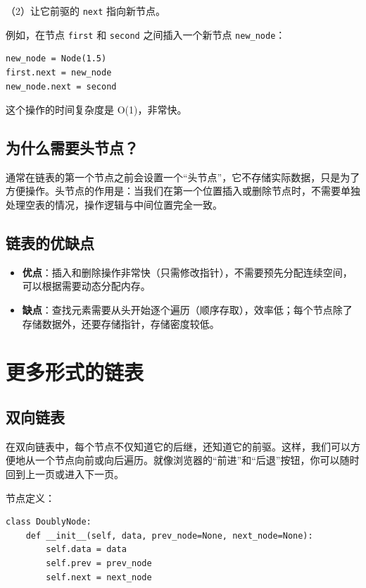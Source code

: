（2）让它前驱的 \texttt{next} 指向新节点。


例如，在节点 \texttt{first} 和 \texttt{second} 之间插入一个新节点 \texttt{new\_node}：

\begin{verbatim}
new_node = Node(1.5)
first.next = new_node
new_node.next = second
\end{verbatim}

这个操作的时间复杂度是 O(1)，非常快。

\subsection{为什么需要头节点？}

通常在链表的第一个节点之前会设置一个“头节点”，它不存储实际数据，只是为了方便操作。头节点的作用是：当我们在第一个位置插入或删除节点时，不需要单独处理空表的情况，操作逻辑与中间位置完全一致。

\subsection{链表的优缺点}

\begin{itemize}
    \item \textbf{优点}：插入和删除操作非常快（只需修改指针），不需要预先分配连续空间，可以根据需要动态分配内存。
    \item \textbf{缺点}：查找元素需要从头开始逐个遍历（顺序存取），效率低；每个节点除了存储数据外，还要存储指针，存储密度较低。
\end{itemize}

\section{更多形式的链表}

\subsection{双向链表}

在双向链表中，每个节点不仅知道它的后继，还知道它的前驱。这样，我们可以方便地从一个节点向前或向后遍历。就像浏览器的“前进”和“后退”按钮，你可以随时回到上一页或进入下一页。

节点定义：

\begin{verbatim}
class DoublyNode:
    def __init__(self, data, prev_node=None, next_node=None):
        self.data = data
        self.prev = prev_node
        self.next = next_node
\end{verbatim}

